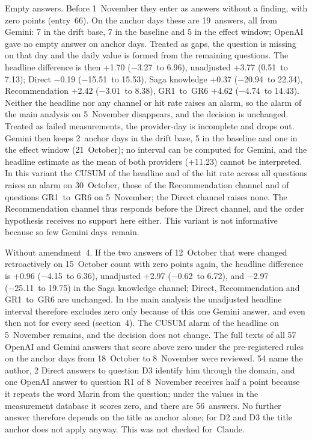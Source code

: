 \documentclass[11pt]{article}
\newcounter{none}
\begin{document}
Empty answers. Before 1~November they enter as answers without a finding, with zero points (entry~66). On the anchor days these are 19~answers, all from Gemini: 7 in the drift base, 7 in the baseline and 5 in the effect window; OpenAI gave no empty answer on anchor days. Treated as gaps, the question is missing on that day and the daily value is formed from the remaining questions. The headline difference is then +1.70 (−3.27~to 6.96), unadjusted +3.77 (0.51~to 7.13); Direct −0.19 (−15.51~to 15.53), Saga knowledge +0.37 (−20.94~to 22.34), Recommendation +2.42 (−3.01~to 8.38), GR1~to~GR6 +4.62 (−4.74~to 14.43). Neither the headline nor any channel or hit rate raises an alarm, so the alarm of the main analysis on 5~November disappears, and the decision is unchanged. Treated as failed measurements, the provider-day is incomplete and drops out. Gemini then keeps 2~anchor days in the drift base, 5 in the baseline and one in the effect window (21~October); no interval can be computed for Gemini, and the headline estimate as the mean of both providers (+11.23) cannot be interpreted. In this variant the CUSUM of the headline and of the hit rate across all questions raises an alarm on 30~October, those of the Recommendation channel and of questions GR1~to~GR6 on 5~November; the Direct channel raises none. The Recommendation channel thus responds before the Direct channel, and the order hypothesis receives no support here either. This variant is not informative because so few Gemini days~\mbox{remain.}

Without amendment~4. If the two answers of 12~October that were changed retroactively on 15~October count with zero points again, the headline difference is +0.96 (−4.15~to 6.36), unadjusted +2.97 (−0.62~to 6.72), and −2.97 (−25.11~to 19.75) in the Saga knowledge channel; Direct, Recommendation and GR1~to~GR6 are unchanged. In the main analysis the unadjusted headline interval therefore excludes zero only because of this one Gemini answer, and even then not for every seed (section~4). The CUSUM alarm of the headline on 5~November remains, and the decision does not change. The full texts of all 57 OpenAI and Gemini answers that score above zero under the pre-registered rules on the anchor days from 18~October to 8~November were reviewed. 54 name the author, 2 Direct answers to question D3 identify him through the domain, and one OpenAI answer to question R1 of 8~November receives half a point because it repeats the word Marin from the question; under the values in the measurement database it scores zero, and there are 56~answers. No further answer therefore depends on the title as anchor alone; for D2 and D3 the title anchor does not apply anyway. This was not checked for~\mbox{Claude.}
\end{document}
